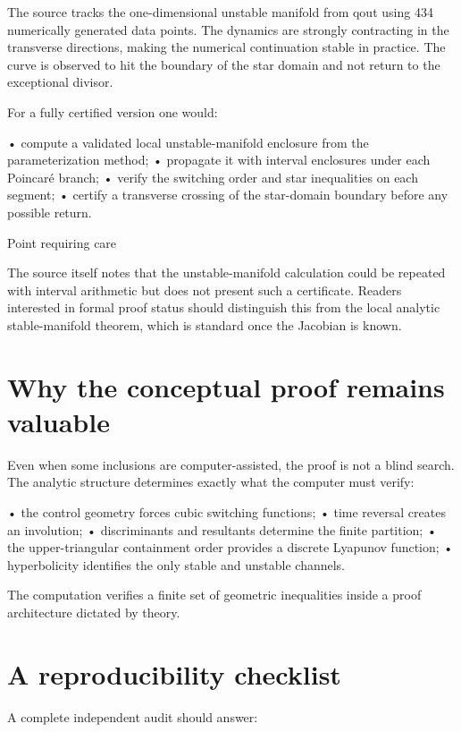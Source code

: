 The source tracks the one-dimensional unstable manifold from qout using 434 numerically generated data points. The dynamics are strongly contracting in the transverse directions, making the numerical continuation stable in practice. The curve is observed to hit the boundary of the star domain and not return to the exceptional divisor.


For a fully certified version one would:


• compute a validated local unstable-manifold enclosure from the parameterization method; • propagate it with interval enclosures under each Poincaré branch; • verify the switching order and star inequalities on each segment; • certify a transverse crossing of the star-domain boundary before any possible return.


\begin{insightbox}{Point requiring care}
\end{insightbox}

The source itself notes that the unstable-manifold calculation could be repeated with interval arithmetic but does not present such a certificate. Readers interested in formal proof status should distinguish this from the local analytic stable-manifold theorem, which is standard once the Jacobian is known.


\section{Why the conceptual proof remains valuable}

Even when some inclusions are computer-assisted, the proof is not a blind search. The analytic structure determines exactly what the computer must verify:


• the control geometry forces cubic switching functions; • time reversal creates an involution; • discriminants and resultants determine the finite partition; • the upper-triangular containment order provides a discrete Lyapunov function; • hyperbolicity identifies the only stable and unstable channels.


The computation verifies a finite set of geometric inequalities inside a proof architecture dictated by theory.


\section{A reproducibility checklist}

A complete independent audit should answer:


